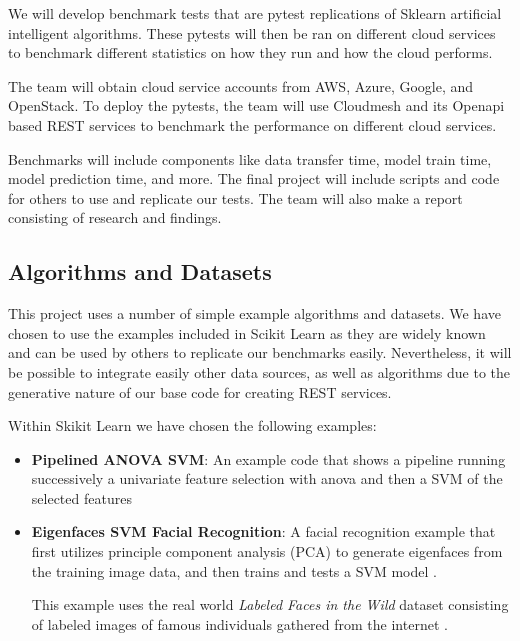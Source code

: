 We will develop benchmark tests that are pytest replications of Sklearn
artificial intelligent algorithms. These pytests will then be ran on
different cloud services to benchmark different statistics on how they
run and how the cloud performs. 

The team will obtain cloud service
accounts from AWS, Azure, Google, and OpenStack. To deploy the pytests,
the team will use Cloudmesh and its Openapi based REST services to
benchmark the performance on different cloud services. 

Benchmarks will
include components like data transfer time, model train time, model
prediction time, and more. The final project will include scripts and
code for others to use and replicate our tests. The team will also make
a report consisting of research and findings.

\subsection{Algorithms and Datasets}
\label{sec:algorithms-and-datasets}

This project uses a number of simple example algorithms and datasets. We
have chosen to use the examples included in Scikit Learn as they are
widely known and can be used by others to replicate our benchmarks
easily. Nevertheless, it will be possible to integrate easily other data
sources, as well as algorithms due to the generative nature of our base
code for creating REST services.

Within Skikit Learn we have chosen the following examples:

\begin{itemize}
\item
  \textbf{Pipelined ANOVA SVM}: An example code that shows a pipeline
  running successively a univariate feature selection with anova and
  then a SVM of the selected features \cite{www-skikit-learn-pipeline,}
\item
  \textbf{Eigenfaces SVM Facial Recognition}: A facial recognition
  example that first utilizes principle component analysis (PCA) to
  generate eigenfaces from the training image data, and then trains and
  tests a SVM model \cite{www-skikit-learn-faces}.

  This example uses the real world {\em Labeled Faces in the Wild} dataset
  consisting of labeled images of famous individuals gathered from the
  internet \cite{faces-data}.

\end{itemize}

